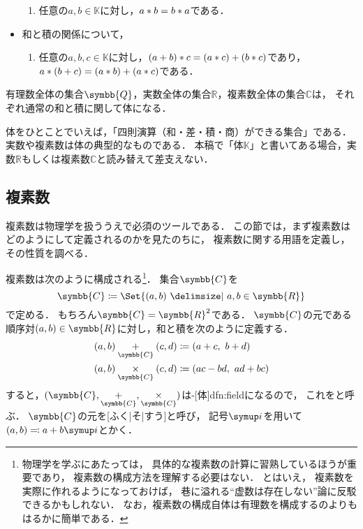 \documentclass[../sotsu.tex]{subfiles}
\begin{document}
\begin{definition}[体]
\begin{itemize}
\begin{enumerate}[resume]
            \item \label{field:prod-commutative} 任意の$a, b \in 𝕂$に対し，$a \mathbin{\ast} b = b \mathbin{\ast} a$である．
        \end{enumerate}
        \item 和と積の関係について，
        \begin{enumerate}[resume]
            \item \label{field:distributive} 任意の$a, b, c \in 𝕂$に対し，$(a + b) \mathbin{\ast} c = (a \mathbin{\ast} c) + (b \mathbin{\ast} c)$であり，$a \mathbin{\ast} (b + c) = (a \mathbin{\ast} b) + (a \mathbin{\ast} c)$である．
        \end{enumerate}    
    \end{itemize}
\end{definition}

\begin{example}
    有理数全体の集合$\symbb{Q}$，実数全体の集合$ℝ$，複素数全体の集合$ℂ$は，
    それぞれ通常の和と積に関して体になる．
\end{example}

体をひとことでいえば，「四則演算（和・差・積・商）ができる集合」である．
実数や複素数は体の典型的なものである．
本稿で「体$𝕂$」と書いてある場合，実数$ℝ$もしくは複素数$ℂ$と読み替えて差支えない．



\subsection{複素数}

複素数は物理学を扱ううえで必須のツールである．
この節では，まず複素数はどのようにして定義されるのかを見たのちに，
複素数に関する用語を定義し，その性質を調べる．


複素数は次のように構成される\footnote{
    物理学を学ぶにあたっては，
    具体的な複素数の計算に習熟しているほうが重要であり，
    複素数の構成方法を理解する必要はない．
    とはいえ，
    複素数を実際に作れるようになっておけば，
    巷に溢れる``虚数は存在しない''論に反駁できるかもしれない．
    なお，複素数の構成自体は有理数を構成するのよりもはるかに簡単である．
}．
集合$\symbb{C}$を
\begin{equation}
    \symbb{C} \coloneq \Set{  (a, b)  \given  a, b \in \symbb{R}  }
\end{equation}
で定める．
もちろん$\symbb{C} = \symbb{R}^2$である．
$\symbb{C}$の元である順序対$(a, b) \in \symbb{R}$に対し，和と積を次のように定義する．
\begin{align}
    (a, b) \underset{\symbb{C}}{+} (c, d) &\coloneq (a+c, \  b+d)  \\
    (a, b) \underset{\symbb{C}}{\times} (c, d) &\coloneq (ac-bd, \  ad+bc)
\end{align}
すると，$(\symbb{C}, \underset{\symbb{C}}{+}, \underset{\symbb{C}}{\times})$は-[体]{dfn:field}になるので，
これをと呼ぶ．
$\symbb{C}$の元を[ふく|そ|すう]と呼び，
記号$\iu$を用いて$(a, b) \eqcolon a + b\iu$とかく．
\end{document}
